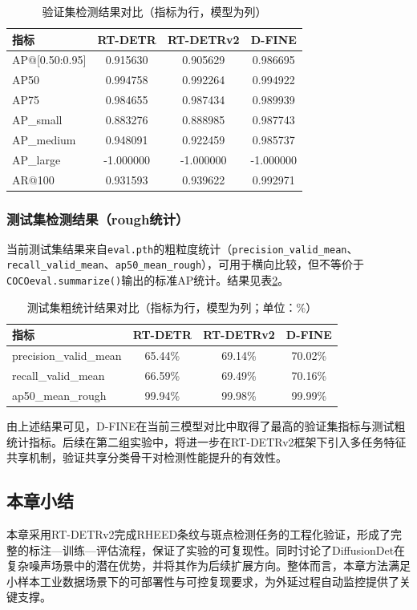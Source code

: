 \begin{table}[h]
    \centering
    \caption{验证集检测结果对比（指标为行，模型为列）}
    \label{tab:cp3_val_metrics_by_model}
    \begin{tabular}{lccc}
        \hline
        \textbf{指标}    & \textbf{RT-DETR} & \textbf{RT-DETRv2} & \textbf{D-FINE} \\ \hline
        AP@[0.50:0.95] & 0.915630         & 0.905629           & 0.986695        \\
        AP50           & 0.994758         & 0.992264           & 0.994922        \\
        AP75           & 0.984655         & 0.987434           & 0.989939        \\
        AP\_small      & 0.883276         & 0.888985           & 0.987743        \\
        AP\_medium     & 0.948091         & 0.922459           & 0.985737        \\
        AP\_large      & -1.000000        & -1.000000          & -1.000000       \\
        AR@100         & 0.931593         & 0.939622           & 0.992971        \\ \hline
    \end{tabular}
\end{table}

\subsubsection{测试集检测结果（rough统计）}

当前测试集结果来自\texttt{eval.pth}的粗粒度统计（\texttt{precision\_valid\_mean}、\texttt{recall\_valid\_mean}、\texttt{ap50\_mean\_rough}），可用于横向比较，但不等价于\texttt{COCOeval.summarize()}输出的标准AP统计。结果见表\ref{tab:cp3_test_rough_metrics_by_model}。

\begin{table}[h]
    \centering
    \caption{测试集粗统计结果对比（指标为行，模型为列；单位：\%）}
    \label{tab:cp3_test_rough_metrics_by_model}
    \begin{tabular}{lccc}
        \hline
        \textbf{指标}            & \textbf{RT-DETR} & \textbf{RT-DETRv2} & \textbf{D-FINE} \\ \hline
        precision\_valid\_mean & 65.44\%          & 69.14\%            & 70.02\%         \\
        recall\_valid\_mean    & 66.59\%          & 69.49\%            & 70.16\%         \\
        ap50\_mean\_rough      & 99.94\%          & 99.98\%            & 99.99\%         \\ \hline
    \end{tabular}
\end{table}

由上述结果可见，D-FINE在当前三模型对比中取得了最高的验证集指标与测试粗统计指标。后续在第二组实验中，将进一步在RT-DETRv2框架下引入多任务特征共享机制，验证共享分类骨干对检测性能提升的有效性。

\subsection{本章小结}

本章采用RT-DETRv2完成RHEED条纹与斑点检测任务的工程化验证，形成了完整的标注—训练—评估流程，保证了实验的可复现性。同时讨论了DiffusionDet在复杂噪声场景中的潜在优势，并将其作为后续扩展方向。整体而言，本章方法满足小样本工业数据场景下的可部署性与可控复现要求，为外延过程自动监控提供了关键支撑。
